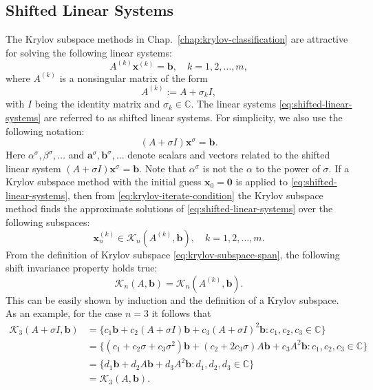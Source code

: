 \subsection{{Shifted Linear Systems}}\label{sec:shifted-linear-systems}
{The Krylov subspace methods in Chap.\ \ref{chap:krylov-classification} are attractive for solving the following linear systems:}
\begin{equation}\label{eq:shifted-linear-systems}A^{(k)}\bm x^{(k)}=\bm b,\quad k=1,2,\ldots,m,\end{equation}
{where $A^{(k)}$ is a nonsingular matrix of the form}
\begin{equation}\label{eq:shifted-coefficient-matrix}A^{(k)}:=A+\sigma_k I,\end{equation}
{with $I$ being the identity matrix and $\sigma_k\in\mathbb C$. The linear systems \eqref{eq:shifted-linear-systems} are referred to as shifted linear systems. For simplicity, we also use the following notation:}
\[(A+\sigma I)\bm x^{\sigma}=\bm b.\]
{Here $\alpha^{\sigma},\beta^{\sigma},\ldots$ and $\bm a^{\sigma},\bm b^{\sigma},\ldots$ denote scalars and vectors related to the shifted linear system $(A+\sigma I)\bm x^{\sigma}=\bm b$. Note that $\alpha^{\sigma}$ is not the $\alpha$ to the power of $\sigma$.}
{If a Krylov subspace method with the initial guess $\bm x_0=\bm0$ is applied to \eqref{eq:shifted-linear-systems}, then from \eqref{eq:krylov-iterate-condition} the Krylov subspace method finds the approximate solutions of \eqref{eq:shifted-linear-systems} over the following subspaces:}
\begin{equation}\label{eq:shifted-krylov-membership}\bm x_n^{(k)}\in\mathcal K_n(A^{(k)},\bm b),\quad k=1,2,\ldots,m.\end{equation}
{From the definition of Krylov subspace \eqref{eq:krylov-subspace-span}, the following shift invariance property holds true:}
\begin{equation}\label{eq:krylov-shift-invariance}\mathcal K_n(A,\bm b)=\mathcal K_n(A^{(k)},\bm b).\end{equation}
{This can be easily shown by induction and the definition of a Krylov subspace. As an example, for the case $n=3$ it follows that}
\[\begin{aligned}\mathcal K_3(A+\sigma I,\bm b)&=\{c_1\bm b+c_2(A+\sigma I)\bm b+c_3(A+\sigma I)^2\bm b:c_1,c_2,c_3\in\mathbb C\}\\
&=\{(c_1+c_2\sigma+c_3\sigma^2)\bm b+(c_2+2c_3\sigma)A\bm b+c_3A^2\bm b:c_1,c_2,c_3\in\mathbb C\}\\
&=\{d_1\bm b+d_2A\bm b+d_3A^2\bm b:d_1,d_2,d_3\in\mathbb C\}\\
&=\mathcal K_3(A,\bm b).\end{aligned}\]
